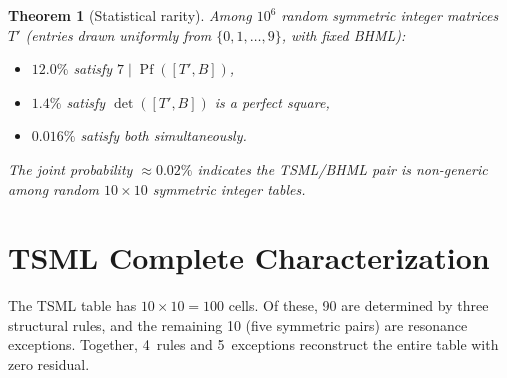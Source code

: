\documentclass[11pt]{article}
\newtheorem{theorem}{Theorem}[section]
\theoremstyle{definition}
\theoremstyle{remark}
\begin{document}
\begin{theorem}[Statistical rarity]
\label{thm:rarity}
Among $10^6$ random symmetric integer matrices $T'$ (entries drawn uniformly
from $\{0,1,\dots,9\}$, with fixed BHML):
\begin{itemize}[nosep]
  \item $12.0\%$ satisfy $7 \mid \operatorname{Pf}([T',B])$,
  \item $1.4\%$ satisfy $\det([T',B])$ is a perfect square,
  \item $0.016\%$ satisfy both simultaneously.
\end{itemize}
The joint probability $\approx 0.02\%$ indicates the TSML/BHML pair is
non-generic among random $10\times 10$ symmetric integer tables.
\end{theorem}

\section{TSML Complete Characterization}
\label{sec:tsml-characterization}

The TSML table has $10 \times 10 = 100$ cells.  Of these, 90 are determined by
three structural rules, and the remaining 10 (five symmetric pairs) are
resonance exceptions.  Together, 4~rules and 5~exceptions reconstruct the
entire table with zero residual.
\end{document}
